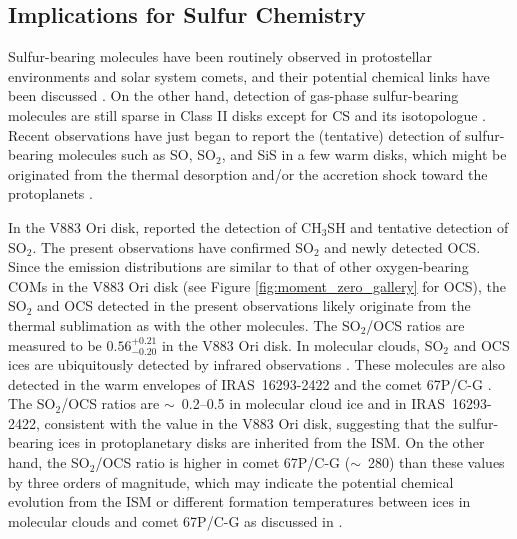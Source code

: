 \documentclass[linenumbers, twocolumn, twocolappendix, astrosymb, times]{aastex631}
\begin{document}
\subsection{Implications for Sulfur Chemistry}
Sulfur-bearing molecules have been routinely observed in protostellar environments and solar system comets, and their potential chemical links have been discussed \citep[e.g.,][]{Drozdovskaya2018}. On the other hand, detection of gas-phase sulfur-bearing molecules are still sparse in Class II disks except for CS and its isotopologue \citep[][and references therein]{LeGal2021}. Recent observations have just began to report the (tentative) detection of sulfur-bearing molecules such as SO, SO$_2$, and SiS in a few warm disks, which might be originated from the thermal desorption and/or the accretion shock toward the protoplanets \citep{Booth2021, Booth2023, Law2023_SiS}. 

In the V883 Ori disk, \citet{Lee2019} reported the detection of CH$_3$SH and tentative detection of SO$_2$. The present observations have confirmed SO$_2$ and newly detected OCS.
Since the emission distributions are similar to that of other oxygen-bearing COMs in the V883 Ori disk (see Figure \ref{fig:moment_zero_gallery} for OCS), the SO$_2$ and OCS detected in the present observations likely originate from the thermal sublimation as with the other molecules. The SO$_2$/OCS ratios are measured to be $0.56_{-0.20}^{+0.21}$ in the V883 Ori disk. In molecular clouds, SO$_2$ and OCS ices are ubiquitously detected by infrared observations \citep[e.g.,][]{Boogert2015, McClure2023}. These molecules are also detected in the warm envelopes of IRAS~16293-2422 \citep{Drozdovskaya2018} and the comet 67P/C-G \citep{Calmonte2016}. The SO$_2$/OCS ratios are $\sim$~0.2--0.5 in molecular cloud ice and in IRAS~16293-2422, consistent with the value in the V883 Ori disk, suggesting that the sulfur-bearing ices in protoplanetary disks are inherited from the ISM. On the other hand, the SO$_2$/OCS ratio is higher in comet 67P/C-G ($\sim$~280) than these values by three orders of magnitude, which may indicate the potential chemical evolution from the ISM or different formation temperatures between ices in molecular clouds and comet 67P/C-G as discussed in \citet{Drozdovskaya2018}.



\end{document}
